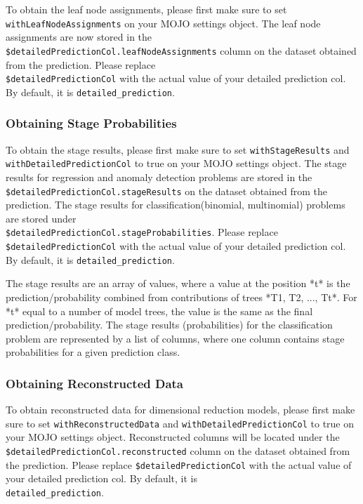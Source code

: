 To obtain the leaf node assignments, please first make sure to set\\ \texttt{withLeafNodeAssignments}
on your MOJO settings object. The leaf node assignments are now stored
in the \texttt{\${detailedPredictionCol}.leafNodeAssignments} column on the dataset obtained from the prediction.
Please replace\\ \texttt{\${detailedPredictionCol}} with the actual value of your detailed prediction col. By default,
it is \texttt{detailed\_prediction}.

\subsubsection{Obtaining Stage Probabilities}

To obtain the stage results, please first make sure to set \texttt{withStageResults} and
\texttt{withDetailedPredictionCol} to true on your MOJO settings object. The stage results for regression and
anomaly detection problems
are stored in the \texttt{\${detailedPredictionCol}.stageResults} on the dataset obtained from the prediction. The
stage results for classification(binomial, multinomial) problems are stored under \\
\texttt{\${detailedPredictionCol}.stageProbabilities}. Please replace \\ \texttt{\${detailedPredictionCol}}
with the actual value of your detailed prediction col. By default, it is \texttt{detailed\_prediction}.

The stage results are an array of values, where a value at the position *t* is the prediction/probability combined
from contributions of trees *T1, T2, ..., Tt*. For *t* equal to a number of model trees, the value is the same as the
final prediction/probability. The stage results (probabilities) for the classification problem
are represented by a list of columns, where one column contains stage probabilities for a given prediction class.

\subsubsection{Obtaining Reconstructed Data}

To obtain reconstructed data for dimensional reduction models, please first make sure to set
\texttt{withReconstructedData} and \texttt{withDetailedPredictionCol} to true on your MOJO settings object.
Reconstructed columns will be located under the
\texttt{\${detailedPredictionCol}.reconstructed} column on the dataset obtained from the prediction.
Please replace \texttt{\${detailedPredictionCol}} with the actual value of your detailed prediction col. By default,
it is\\ \texttt{detailed\_prediction}.

